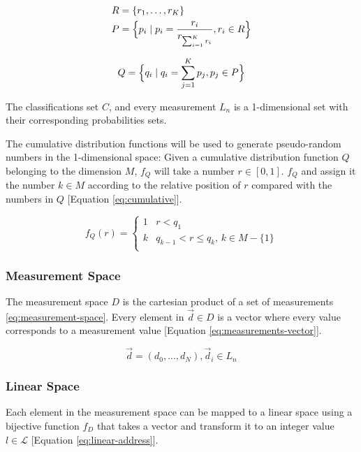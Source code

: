 \documentclass[letterpaper, conference]{IEEEtran}
\begin{document}
\begin{equation}\label{eq:pmf}
  \begin{aligned}
  R &= \{r_1, \dots, r_K\} \\
  P &= \Bigl\{p_i \mid p_i = \frac{r_i}{r_{\sum_{i = 1}^{K} r_i}}, r_i \in R \Bigr\}
  \end{aligned}
\end{equation}

\begin{equation}\label{eq:cdf}
Q = \Bigl\{q_i \mid q_i = \sum_{j = 1}^{K} p_j, p_j \in P \Bigr\}
\end{equation}

The classifications set $C$, and every measurement $L_n$ is a 1-dimensional set with their corresponding probabilities sets.

The cumulative distribution functions will be used to generate pseudo-random numbers in the 1-dimensional space: Given a cumulative distribution function $Q$ belonging to the dimension $M$, $f_Q$ will take a number $r \in [0, 1]$. $f_Q$ and assign it the number $k \in M$ according to the relative position of $r$ compared with the numbers in $Q$ [Equation \ref{eq:cumulative}].

\begin{equation}\label{eq:cumulative}
  f_Q(r) =
  \begin{cases}
  1 & r < q_1 \\
  k & q_{k - 1} < r \leq q_k,\, k \in M - \{1\} \\
  \end{cases}
\end{equation}

\subsubsection{Measurement Space}
The measurement space $D$ is the cartesian product of a set of measurements \ref{eq:measurement-space}. Every element in $\vec{d} \in D$ is a vector where every value corresponds to a measurement value [Equation \ref{eq:measurements-vector}].

\begin{equation}\label{eq:measurements-vector}
  \vec{d} = (d_0, ..., d_N), \vec{d}_i \in L_n
\end{equation}

\subsubsection{Linear Space}
Each element in the measurement space can be mapped to a linear space using a bijective function $f_D$ that takes a vector and transform it to an integer value $l \in \mathcal{L}$ [Equation \ref{eq:linear-address}].
\end{document}
